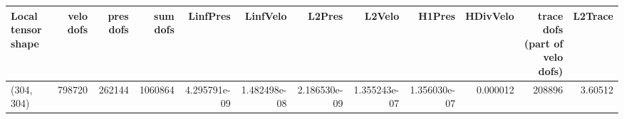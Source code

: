 \begin{tabular}{lrrrrrrrrrrr}
\toprule
Local tensor shape &  velo dofs &  pres dofs &  sum dofs &     LinfPres &     LinfVelo &       L2Pres &       L2Velo &       H1Pres &  HDivVelo &  trace dofs (part of velo dofs) &  L2Trace \\
\midrule
        (304, 304) &     798720 &     262144 &   1060864 & 4.295791e-09 & 1.482498e-08 & 2.186530e-09 & 1.355243e-07 & 1.356030e-07 &  0.000012 &                          208896 &  3.60512 \\
\bottomrule
\end{tabular}
